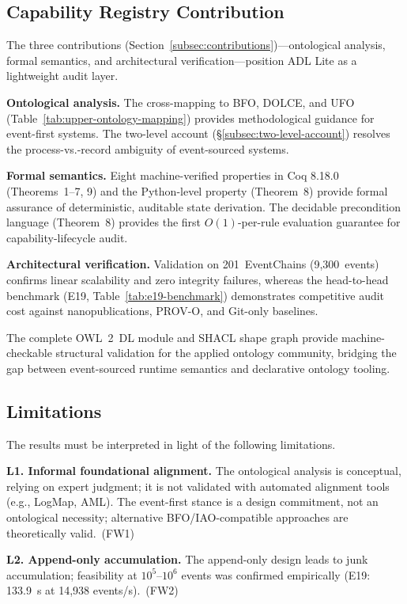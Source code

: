 \subsection{Capability Registry Contribution}\label{subsec:conceptual-modeling}

The three contributions (Section~\ref{subsec:contributions})---ontological analysis, formal semantics, and architectural verification---position ADL Lite as a lightweight audit layer.

\textbf{Ontological analysis.} The cross-mapping to BFO, DOLCE, and UFO (Table~\ref{tab:upper-ontology-mapping}) provides methodological guidance for event-first systems. The two-level account (\S\ref{subsec:two-level-account}) resolves the process-vs.-record ambiguity of event-sourced systems.

\textbf{Formal semantics.} Eight machine-verified properties in Coq 8.18.0 (Theorems~1--7, 9) and the Python-level property (Theorem~8) provide formal assurance of deterministic, auditable state derivation. The decidable precondition language (Theorem~8) provides the first $O(1)$-per-rule evaluation guarantee for capability-lifecycle audit.

\textbf{Architectural verification.} Validation on 201~EventChains (9,300~events) confirms linear scalability and zero integrity failures, whereas the head-to-head benchmark (E19, Table~\ref{tab:e19-benchmark}) demonstrates competitive audit cost against nanopublications, PROV-O, and Git-only baselines.

The complete OWL~2~DL module and SHACL shape graph provide machine-checkable structural validation for the applied ontology community, bridging the gap between event-sourced runtime semantics and declarative ontology tooling.

\subsection{Limitations}\label{subsec:limitations}

The results must be interpreted in light of the following limitations.

\textbf{L1. Informal foundational alignment.} The ontological analysis is conceptual, relying on expert judgment; it is not validated with automated alignment tools (e.g., LogMap, AML). The event-first stance is a design commitment, not an ontological necessity; alternative BFO/IAO-compatible approaches are theoretically valid.~(FW1)

\textbf{L2. Append-only accumulation.} The append-only design leads to junk accumulation; feasibility at $10^5$--$10^6$ events was confirmed empirically (E19: 133.9~s at 14,938 events/s).~(FW2)

